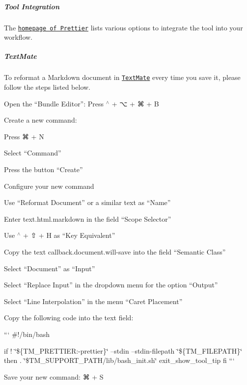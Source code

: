 \subparagraph*{Tool Integration}

The \href{https://prettier.io}{\tt homepage of Prettier} lists various options to integrate the tool into your workflow.

\subparagraph*{Text\+Mate}

To reformat a Markdown document in \href{https://macromates.com}{\tt Text\+Mate} every time you save it, please follow the steps listed below.


\begin{DoxyEnumerate}
\item Open the “\+Bundle Editor”\+: Press {\ttfamily $^\wedge$} + {\ttfamily ⌥} + {\ttfamily ⌘} + {\ttfamily B}
\item Create a new command\+:
\begin{DoxyEnumerate}
\item Press {\ttfamily ⌘} + {\ttfamily N}
\item Select “\+Command”
\item Press the button “\+Create”
\end{DoxyEnumerate}
\item Configure your new command
\begin{DoxyEnumerate}
\item Use “\+Reformat Document” or a similar text as “\+Name”
\item Enter {\ttfamily text.\+html.\+markdown} in the field “\+Scope Selector”
\item Use {\ttfamily $^\wedge$} + {\ttfamily ⇧} + {\ttfamily H} as “\+Key Equivalent”
\item Copy the text {\ttfamily callback.\+document.\+will-\/save} into the field “\+Semantic Class”
\item Select “\+Document” as “\+Input”
\item Select “\+Replace Input” in the dropdown menu for the option “\+Output”
\item Select “\+Line Interpolation” in the menu “\+Caret Placement”
\item Copy the following code into the text field\+:

``` \#!/bin/bash

if ! \char`\"{}\$\{\+T\+M\+\_\+\+P\+R\+E\+T\+T\+I\+E\+R\+:-\/prettier\}\char`\"{} --stdin --stdin-\/filepath \char`\"{}\$\{\+T\+M\+\_\+\+F\+I\+L\+E\+P\+A\+T\+H\}\char`\"{} then . \char`\"{}\$\+T\+M\+\_\+\+S\+U\+P\+P\+O\+R\+T\+\_\+\+P\+A\+T\+H/lib/bash\+\_\+init.\+sh\char`\"{} exit\+\_\+show\+\_\+tool\+\_\+tip fi ```
\item Save your new command\+: {\ttfamily ⌘} + {\ttfamily S}
\end{DoxyEnumerate}
\end{DoxyEnumerate}

